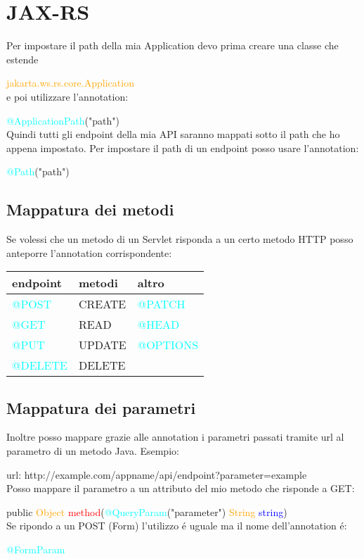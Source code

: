 \documentclass[11pt, letterpaper, titlepage]{article}
\newcommand{\class}[1]{\textcolor{orange}{#1}}
\newcommand{\object}[1]{\textcolor{blue}{#1}}
\newcommand{\method}[1]{\textcolor{red}{#1}}
\newcommand{\annotation}[1]{\textcolor{cyan}{#1}}
\begin{document}
\section{JAX-RS}
Per impostare il path della mia Application devo prima creare una classe che estende\par
\class{jakarta.ws.rs.core.Application}\\
e poi utilizzare l'annotation:\par
\annotation{@ApplicationPath}("path")\\
Quindi tutti gli endpoint della mia API saranno mappati sotto il path che ho appena
impostato. Per impostare il path di un endpoint posso usare l'annotation:\par
\annotation{@Path}("path")

\subsection{Mappatura dei metodi}
Se volessi che un metodo di un Servlet risponda a un certo metodo HTTP posso anteporre
l'annotation corrispondente:
\begin{table}[h!]
    \begin{tabularx}{\textwidth}{| >{\centering\arraybackslash}X | >{\centering\arraybackslash}X | >{\centering\arraybackslash}X |}
        \hline
        endpoint             & metodi & altro                 \\
        \hline\hline
        \annotation{@POST}   & CREATE & \annotation{@PATCH}   \\
        \hline
        \annotation{@GET}    & READ   & \annotation{@HEAD}    \\
        \hline
        \annotation{@PUT}    & UPDATE & \annotation{@OPTIONS} \\
        \hline
        \annotation{@DELETE} & DELETE &                       \\
        \hline
    \end{tabularx}
\end{table}

\subsection{Mappatura dei parametri}
Inoltre posso mappare grazie alle annotation i parametri passati tramite url al parametro di un metodo Java.
Esempio:\par
url: http://example.com/appname/api/endpoint?parameter=example\\
Posso mappare il parametro a un attributo del mio metodo che risponde a GET:\par
public \class{Object} \method{method}(\annotation{@QueryParam}("parameter") \class{String} \object{string})\\
Se ripondo a un POST (Form) l'utilizzo \'e uguale ma il nome dell'annotation \'e:\par
\annotation{@FormParam}
\end{document}
